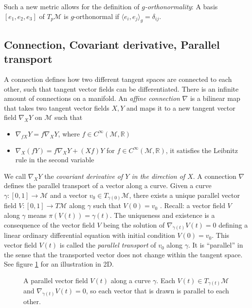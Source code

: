 \documentclass[../thesis.tex]{subfiles}
\begin{document}
Such a new metric allows for the definition of \emph{$g$-orthonormality}:
A basis $[e_1, e_2, e_3]$ of $T_p\mathcal{M}$ is $g$-orthonormal if $\langle e_i, e_j \rangle_g = \delta_{ij}$.

\subsection{Connection, Covariant derivative, Parallel transport}
A connection defines how two different tangent spaces are connected to each other, such that tangent vector fields
can be differentiated. There is an infinite amount of connections on a manifold.
An \emph{affine connection} $\nabla$ is a bilinear map that takes two tangent vector fields $X,Y$ and maps it
to a new tangent vector field $\nabla_XY$ on $\mathcal{M}$ such that
\begin{itemize}
  \item $\nabla_{fX}Y = f \nabla_XY$, where $f\in C^{\infty}(\mathcal{M}, \mathbb{R})$
  \item $\nabla_X(fY) = f\nabla_XY + (Xf)Y$ for $f\in C^{\infty}(\mathcal{M}, \mathbb{R})$, it satisfies the Leibnitz rule in the second variable
\end{itemize}
We call $\nabla_XY$ the \emph{covariant derivative of $Y$ in the direction of $X$}.
A connection $\nabla$ defines the parallel transport
of a vector along a curve. Given a curve $\gamma: [0,1] \to \mathcal{M}$ and
a vector $v_0 \in T_{\gamma(0)}\mathcal{M}$, there exists a unique parallel vector field $V: [0,1] \to T\mathcal{M}$ along $\gamma$
such that $V(0) = v_0$ \cite{LeeCurvature}.
Recall: a vector field $V$ along $\gamma$ means $\pi(V(t))=\gamma(t)$.
The uniqueness and existence is a consequence of the vector field $V$ being the solution
of $\nabla_{\dot{\gamma}(t)}V(t) = 0$ defining a linear ordinary differential equation with initial condition
$V(0)=v_0$. This vector field $V(t)$ is called the \emph{parallel transport} of $v_0$ along $\gamma$.
It is ``parallel'' in the sense that the transported vector does not change within the tangent space.
See figure \ref{fig:vectorfield} for an illustration in 2D.
\begin{figure}[htb]
  \centering
  \def\svgwidth{20em}
  
  \caption{A parallel vector field $V(t)$ along a curve $\gamma$. Each $V(t)\in T_{\gamma(t)}\mathcal{M}$ and
  $\nabla_{\dot{\gamma}(t)}V(t) = 0$, so each vector that is drawn is parallel to each other.}
  \label{fig:vectorfield}
\end{figure}
 
\end{document}
